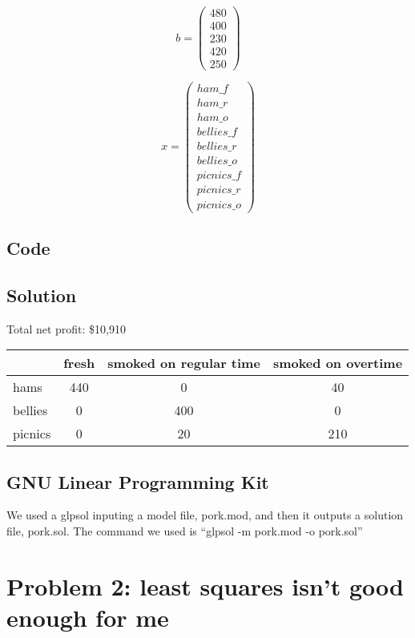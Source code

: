 \documentclass[a4paper,10pt]{article}
\begin{document}
	\[ b = \left( \begin{array}{c}
	480\\
	400\\
	230\\
	420\\
	250
	\end{array} \right)\]
	

	\[ x = \left( \begin{array}{c}
	ham\_f\\
	ham\_r\\
	ham\_o\\
	bellies\_f\\
	bellies\_r\\
	bellies\_o\\
	picnics\_f\\
	picnics\_r\\
	picnics\_o
	\end{array} \right)\]

	\subsection{Code}
	      

	\newpage
	\subsection{Solution}
	Total net profit: \$10,910\\
	\begin{tabular}{lccc}
\hline
	& fresh & smoked on regular time & smoked on overtime\\
\hline
	hams & 440 & 0 & 40\\
	bellies & 0 & 400 & 0\\
	picnics & 0 & 20 & 210
	\end{tabular}

	\subsection{GNU Linear Programming Kit}
	      We used a glpsol inputing a model file, pork.mod, and then it outputs a solution file, pork.sol.  The command we used is ``glpsol -m pork.mod -o pork.sol''



	\section{Problem 2: least squares isn’t good enough for me}
		
\end{document}
